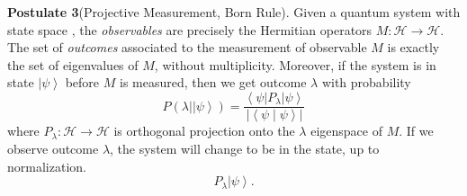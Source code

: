 \textbf{Postulate 3}(Projective Measurement, Born Rule). 
Given a quantum system with state space , the \textit{observables} are precisely the Hermitian operators $M: \mathscr{H} \to \mathscr{H}$. 
The set of \textit{outcomes} associated to the measurement of observable $M$ is exactly the set of eigenvalues of $M$, without multiplicity.
Moreover, if the system is in state $\left| \psi \right\rangle$ before $M$ is measured, then we get outcome $\lambda$ with probability 
\[
	P(\lambda | \left| \psi \right\rangle ) = \frac{\left\langle \psi \right| P_\lambda \left| \psi \right\rangle }{\left| \left\langle \psi \middle| \psi \right\rangle  \right| }
\] 
where $P_\lambda: \mathscr{H} \to  \mathscr{H}$ is orthogonal projection onto the $\lambda$ eigenspace of $M$.
If we observe outcome $\lambda$, the system will change to be in the state, up to normalization.
\[
	P_\lambda \left| \psi \right\rangle 
.\] 
